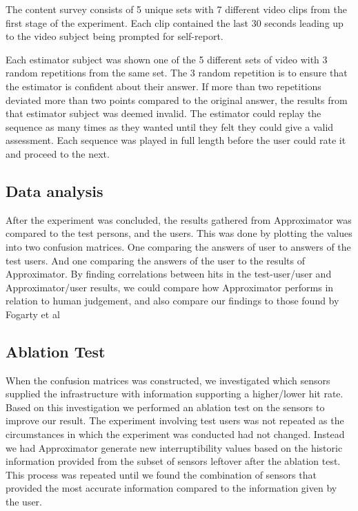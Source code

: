 \documentclass{sigchi}
\begin{document}
The content survey consists of 5 unique sets with 7 different video clips from the first stage of the experiment.
Each clip contained the last 30 seconds leading up to the video subject being prompted for self-report.

Each estimator subject was shown one of the 5 different sets of video with 3 random repetitions from the same set.
The 3 random repetition is to ensure that the estimator is confident about their answer.
If more than two repetitions deviated more than two points compared to the original answer, the results from that estimator subject was deemed invalid.
The estimator could replay the sequence as many times as they wanted until they felt they could give a valid assessment.
Each sequence was played in full length before the user could rate it and proceed to the next.

\subsection{Data analysis}
After the experiment was concluded, the results gathered from Approximator was compared to the test persons, and the users.
This was done by plotting the values into two confusion matrices.
One comparing the answers of user to answers of the test users.
And one comparing the answers of the user to the results of Approximator.
By finding correlations between hits in the test-user/user and Approximator/user results, we could compare how Approximator performs in relation to human judgement, and also compare our findings to those found by Fogarty et al \cite{fogarty2005predicting}

\subsection{Ablation Test}
When the confusion matrices was constructed, we investigated which sensors supplied the infrastructure with information supporting a higher/lower hit rate.
Based on this investigation we performed an ablation test on the sensors to improve our result.
The experiment involving test users was not repeated as the circumstances in which the experiment was conducted had not changed.
Instead we had Approximator generate new interruptibility values based on the historic information provided from the subset of sensors leftover after the ablation test.
This process was repeated until we found the combination of sensors that provided the most accurate information compared to the information given by the user.
\end{document}
